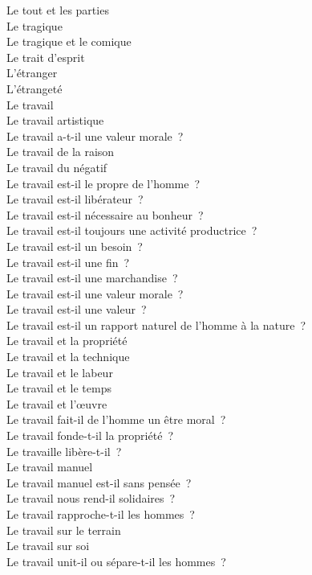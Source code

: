 \documentclass[a4paper,12pt]{article}
\begin{document}
Le tout et les parties \\
Le tragique \\
Le tragique et le comique \\
Le trait d'esprit \\
L'étranger \\
L'étrangeté \\
Le travail \\
Le travail artistique \\
Le travail a-t-il une valeur morale ? \\
Le travail de la raison \\
Le travail du négatif \\
Le travail est-il le propre de l'homme ? \\
Le travail est-il libérateur ? \\
Le travail est-il nécessaire au bonheur ? \\
Le travail est-il toujours une activité productrice ? \\
Le travail est-il un besoin ? \\
Le travail est-il une fin ? \\
Le travail est-il une marchandise ? \\
Le travail est-il une valeur morale ? \\
Le travail est-il une valeur ? \\
Le travail est-il un rapport naturel de l'homme à la nature ? \\
Le travail et la propriété \\
Le travail et la technique \\
Le travail et le labeur \\
Le travail et le temps \\
Le travail et l'œuvre \\
Le travail fait-il de l'homme un être moral ? \\
Le travail fonde-t-il la propriété ? \\
Le travaille libère-t-il ? \\
Le travail manuel \\
Le travail manuel est-il sans pensée ? \\
Le travail nous rend-il solidaires ? \\
Le travail rapproche-t-il les hommes ? \\
Le travail sur le terrain \\
Le travail sur soi \\
Le travail unit-il ou sépare-t-il les hommes ? \\
\end{document}
